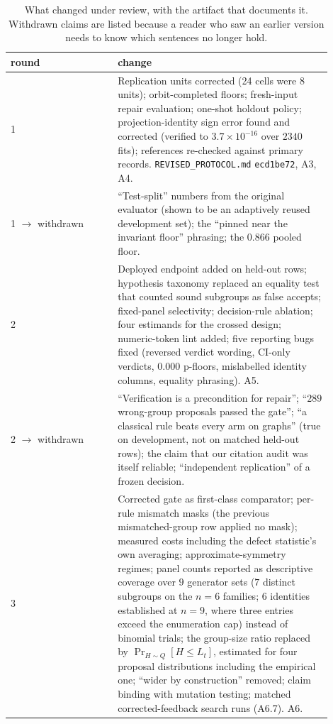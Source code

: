 \documentclass{neurips_2024}
\begin{document}
\begin{table}[t]
\centering
\caption{What changed under review, with the artifact that documents it. Withdrawn claims are
listed because a reader who saw an earlier version needs to know which sentences no longer
hold.}
\label{tab:audit}
\small
\begin{tabular}{@{}p{0.30\linewidth}p{0.60\linewidth}@{}}
\toprule
round & change \\
\midrule
1 & Replication units corrected (24 cells were $8$ units); orbit-completed floors;
fresh-input repair evaluation; one-shot holdout policy; projection-identity sign error found
and corrected (verified to $3.7\times10^{-16}$ over $2340$ fits); references re-checked against
primary records. \texttt{REVISED\_PROTOCOL.md} \texttt{ecd1be72}, A3, A4. \\
1 $\to$ withdrawn & ``Test-split'' numbers from the original evaluator (shown to be an
adaptively reused development set); the ``pinned near the invariant floor'' phrasing; the
$0.866$ pooled floor. \\
2 & Deployed endpoint added on held-out rows; hypothesis taxonomy replaced an equality test
that counted sound subgroups as false accepts; fixed-panel selectivity; decision-rule ablation;
four estimands for the crossed design; numeric-token lint added; five reporting bugs fixed
(reversed verdict wording, CI-only verdicts, $0.000$ p-floors, mislabelled identity columns,
equality phrasing). A5. \\
2 $\to$ withdrawn & ``Verification is a precondition for repair''; ``$289$ wrong-group
proposals passed the gate''; ``a classical rule beats every arm on graphs'' (true on
development, not on matched held-out rows); the claim that our citation audit was itself
reliable; ``independent replication'' of a frozen decision. \\
3 & Corrected gate as first-class comparator; per-rule mismatch masks (the previous
mismatched-group row applied no mask); measured costs including the defect statistic's own
averaging; approximate-symmetry regimes; panel counts reported as descriptive coverage over
$9$ generator sets ($7$ distinct subgroups on the $n{=}6$ families; $6$ identities established
at $n{=}9$, where three entries exceed the enumeration cap) instead of binomial trials; the
group-size ratio replaced by $\Pr_{H\sim Q}[H \le L_t]$, estimated for four proposal
distributions including the empirical one; ``wider by construction'' removed; claim binding
with mutation testing; matched corrected-feedback search runs (A6.7). A6. \\

\end{tabular}
\end{table}
\end{document}
